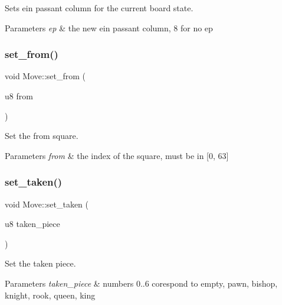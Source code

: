 Sets ein passant column for the current board state. 


\begin{DoxyParams}{Parameters}
{\em ep} & the new ein passant column, 8 for no ep \\
\hline
\end{DoxyParams}
\mbox{\label{structMove_a964e2bdf3924d22e85a750a7fbcb7b9d}} 
\subsubsection{\texorpdfstring{set\+\_\+from()}{set\_from()}}
{\footnotesize\ttfamily void Move\+::set\+\_\+from (\begin{DoxyParamCaption}\item[{u8}]{from }\end{DoxyParamCaption})\hspace{0.3cm}{\ttfamily [inline]}}



Set the from square. 


\begin{DoxyParams}{Parameters}
{\em from} & the index of the square, must be in \mbox{[}0, 63\mbox{]} \\
\hline
\end{DoxyParams}
\mbox{\label{structMove_ab34f3b5e429c67794171191efc21e3a2}} 
\subsubsection{\texorpdfstring{set\+\_\+taken()}{set\_taken()}}
{\footnotesize\ttfamily void Move\+::set\+\_\+taken (\begin{DoxyParamCaption}\item[{u8}]{taken\+\_\+piece }\end{DoxyParamCaption})\hspace{0.3cm}{\ttfamily [inline]}}



Set the taken piece. 


\begin{DoxyParams}{Parameters}
{\em taken\+\_\+piece} & numbers 0..6 corespond to empty, pawn, bishop, knight, rook, queen, king \\
\hline
\end{DoxyParams}
\mbox{\label{structMove_a7736e5d558bee44851f619ab6b866f2f}} 
